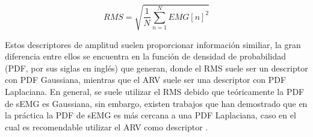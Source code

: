 \begin{equation}
	RMS = \sqrt{\frac{1}{N} \sum_{n=1}^{N} EMG[n]^{2}}
	\label{RMS}
\end{equation}

Estos descriptores de amplitud suelen proporcionar información similiar, la gran diferencia entre ellos se encuentra en la función de densidad de probabilidad (PDF, por sus siglas en inglés) que generan, donde el RMS suele ser un descriptor con PDF Gaussiana, mientras que el ARV suele ser una descriptor con PDF Laplaciana. En general, se suele utilizar el RMS debido que teóricamente la PDF de sEMG es Gaussiana, sin embargo, existen trabajos que han demostrado que en la práctica la PDF de sEMG es más cercana a una PDF Laplaciana, caso en el cual es recomendable utilizar el ARV como descriptor \cite{Clancy1999}\cite{Phinyomark2013}.